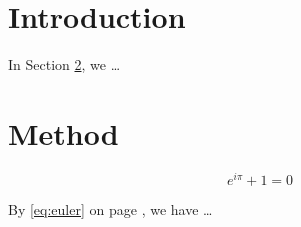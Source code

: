 \documentclass{article}
\begin{document}
\section{Introduction}
\label{sec:intro}

In Section \ref{sec:method}, we \ldots

\section{Method}
\label{sec:method}

\begin{equation}
\label{eq:euler}
e^{i\pi} + 1 = 0
\end{equation}

By \eqref{eq:euler} on page
\pageref{eq:euler}, we have \ldots
\end{document}
